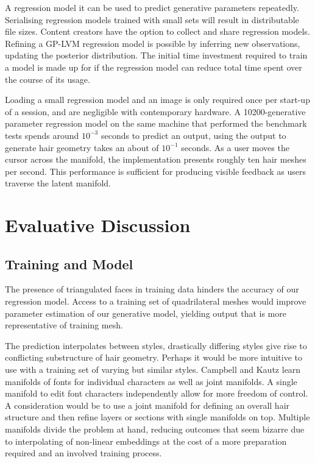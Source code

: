 \documentclass[ %
author={Dillon Keith Diep},
supervisor={Dr. Carl Henrik Ek},
degree={MEng},
title={ART-CG:},
subtitle={Assisted Real-time Content Generation of 3D Hair by Learning Manifolds},
type={Research},
year={2017} ]{dissertation}
\begin{document}
A regression model it can be used to predict generative parameters repeatedly. Serialising regression models trained with small sets will result in distributable file sizes. Content creators have the option to collect and share regression models. Refining a GP-LVM regression model is possible by inferring new observations, updating the posterior distribution. The initial time investment required to train a model is made up for if the regression model can reduce total time spent over the course of its usage.

Loading a small regression model and an image is only required once per start-up of a session, and are negligible with contemporary hardware. A 10200-generative parameter regression model on the same machine that performed the benchmark tests spends around $10^{-3}$ seconds to predict an output, using the output to generate hair geometry takes an about of $10^{-1}$ seconds. As a user moves the cursor across the manifold, the implementation presents roughly ten hair meshes per second. This performance is sufficient for producing visible feedback as users traverse the latent manifold.

\section{Evaluative Discussion}
\subsection{Training and Model}
The presence of triangulated faces in training data hinders the accuracy of our regression model. Access to a training set of quadrilateral meshes would improve parameter estimation of our generative model, yielding output that is more representative of training mesh.

The prediction interpolates between styles, drastically differing styles give rise to conflicting substructure of hair geometry. Perhaps it would be more intuitive to use with a training set of varying but similar styles. Campbell and Kautz \cite{fontmanifold} learn manifolds of fonts for individual characters as well as joint manifolds. A single manifold to edit font characters independently allow for more freedom of control. A consideration would be to use a joint manifold for defining an overall hair structure and then refine layers or sections with single manifolds on top. Multiple manifolds divide the problem at hand, reducing outcomes that seem bizarre due to interpolating of non-linear embeddings at the cost of a more preparation required and an involved training process.
\end{document}
